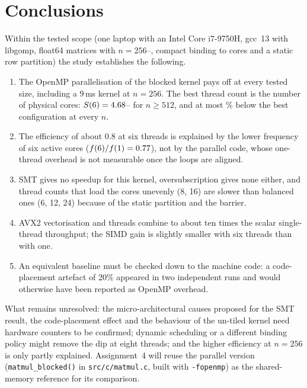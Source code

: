 \documentclass[conference,a4paper]{IEEEtran}
\begin{document}
\section{Conclusions}
\label{sec:conclusions}
Within the tested scope (one laptop with an Intel Core i7-9750H, gcc~13 with libgomp, float64 matrices with
$n=256$--\NLargest, compact binding to cores and a static row partition) the study establishes the following.
\begin{enumerate}
\item The OpenMP parallelisation of the blocked kernel pays off at every tested size, including a 9\,ms kernel at
  $n=256$. The best thread count is the number of physical cores: $S(6)=4.68$--\SSixNTenTwentyFour{} for
  $n\ge512$, and at most \SixVsBestMinPct\% below the best configuration at every $n$.
\item The efficiency of about 0.8 at six threads is explained by the lower frequency of six active cores
  ($f(6)/f(1)=0.77$), not by the parallel code, whose one-thread overhead is not measurable once the loops are
  aligned.
\item SMT gives no speedup for this kernel, oversubscription gives none either, and thread counts that load the cores
  unevenly (8, 16) are slower than balanced ones (6, 12, 24) because of the static partition and the barrier.
\item AVX2 vectorisation and threads combine to about ten times the scalar single-thread throughput; the SIMD gain is
  slightly smaller with six threads than with one.
\item An equivalent baseline must be checked down to the machine code: a code-placement artefact of 20\% appeared in two
  independent runs and would otherwise have been reported as OpenMP overhead.
\end{enumerate}
What remains unresolved: the micro-architectural causes proposed for the SMT result, the code-placement effect and the
behaviour of the un-tiled kernel need hardware counters to be confirmed; dynamic scheduling or a different binding policy
might remove the dip at eight threads; and the higher efficiency at $n=256$ is only partly explained. Assignment~4 will
reuse the parallel version (\texttt{matmul\_blocked()} in \texttt{src/c/matmul.c}, built with \texttt{-fopenmp}) as the shared-memory reference for its comparison.

\end{document}
